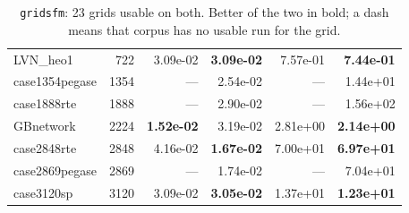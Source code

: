 \documentclass[10pt]{article}
\begin{document}
\begin{table}[H]
\begin{tabular}{lr rr rr}
LVN\_heo1 & 722 & 3.09e-02 & \textbf{3.09e-02} & 7.57e-01 & \textbf{7.44e-01} \\
case1354pegase & 1354 & --- & 2.54e-02 & --- & 1.44e+01 \\
case1888rte & 1888 & --- & 2.90e-02 & --- & 1.56e+02 \\
GBnetwork & 2224 & \textbf{1.52e-02} & 3.19e-02 & 2.81e+00 & \textbf{2.14e+00} \\
case2848rte & 2848 & 4.16e-02 & \textbf{1.67e-02} & 7.00e+01 & \textbf{6.97e+01} \\
case2869pegase & 2869 & --- & 1.74e-02 & --- & 7.04e+01 \\
case3120sp & 3120 & 3.09e-02 & \textbf{3.05e-02} & 1.37e+01 & \textbf{1.23e+01} \\
\bottomrule
\end{tabular}
\caption{\texttt{gridsfm}: 23 grids usable on both. Better of the two in bold; a dash means that corpus
has no usable run for the grid.}
\end{table}
\end{document}
